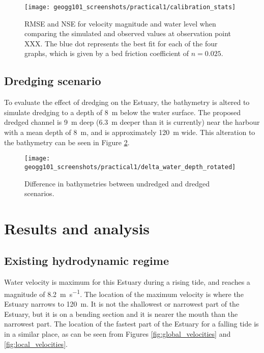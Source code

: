 \documentclass{article}
\begin{document}
\begin{figure}[hbp]
    \centering
    \texttt{[image: geogg101\_screenshots/practical1/calibration\_stats]}
    \caption{RMSE and NSE for velocity magnitude and water level when comparing the simulated and observed values at observation point XXX. The blue dot represents the best fit for each of the four graphs, which is given by a bed friction coefficient of $n = 0.025$.}
    \label{fig:calibration_stats}
\end{figure}

\subsection{Dredging scenario}

To evaluate the effect of dredging on the Estuary, the bathymetry is altered to simulate dredging to a depth of \SI{8}{m} below the water surface. The proposed dredged channel is \SI{9}{m} deep (\SI{6.3}{m} deeper than it is currently) near the harbour with a mean depth of \SI{8}{m}, and is approximately \SI{120}{m} wide. This alteration to the bathymetry can be seen in Figure \ref{fig:delta_depth}.

\begin{figure}[hbp]
    \centering
    \texttt{[image: geogg101\_screenshots/practical1/delta\_water\_depth\_rotated]}
    \caption{Difference in bathymetries between undredged and dredged scenarios.}
    \label{fig:delta_depth}
\end{figure}

\newpage
\section{Results and analysis}

\subsection{Existing hydrodynamic regime}

Water velocity is maximum for this Estuary during a rising tide, and reaches a magnitude of \SI{8.2}{m.s^{-1}}. The location of the maximum velocity is where the Estuary narrows to \SI{120}{m}. It is not the shallowest or narrowest part of the Estuary, but it is on a bending section and it is nearer the mouth than the narrowest part. The location of the fastest part of the Estuary for a falling tide is in a similar place, as can be seen from Figures \ref{fig:global_velocities} and \ref{fig:local_velocities}.
\end{document}
